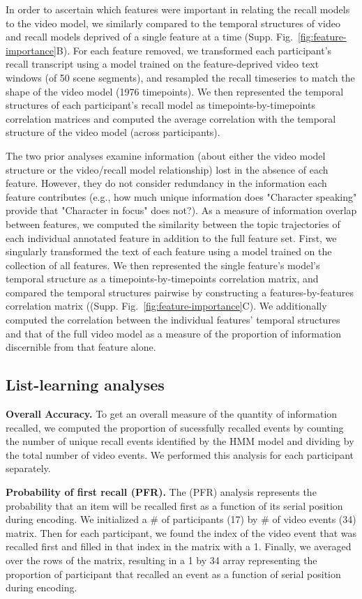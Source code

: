 \documentclass{article}
\begin{document}
In order to ascertain which features were important in relating the recall models to the video model, we similarly compared to the temporal structures of video and recall models deprived of a single feature at a time (Supp. Fig.~\ref{fig:feature-importance}B). For each feature removed, we transformed each participant’s recall transcript using a model trained on the feature-deprived video text windows (of 50 scene segments), and resampled the recall timeseries to match the shape of the video model (1976 timepoints). We then represented the temporal structures of each participant’s recall model as timepoints-by-timepoints correlation matrices and computed the average correlation with the temporal structure of the video model (across participants).

The two prior analyses examine information (about either the video model structure or the video/recall model relationship) lost in the absence of each feature. However, they do not consider redundancy in the information each feature contributes (e.g., how much unique information does "Character speaking" provide that "Character in focus" does not?). As a measure of information overlap between features, we computed the similarity between the topic trajectories of each individual annotated feature in addition to the full feature set. First, we singularly transformed the text of each feature using a model trained on the collection of all features. We then represented the single feature's model's temporal structure as a timepoints-by-timepoints correlation matrix, and compared the temporal structures pairwise by constructing a features-by-features correlation matrix ((Supp. Fig.~\ref{fig:feature-importance}C). We additionally computed the correlation between the individual features' temporal structures and that of the full video model as a measure of the proportion of information discernible from that feature alone.

\subsection*{List-learning analyses}
\textbf{Overall Accuracy.}  To get an overall measure of the quantity of information recalled, we computed the proportion of sucessfully recalled events by counting the number of unique recall events identified by the HMM model and dividing by the total number of video events.  We performed this analysis for each participant separately.

\textbf{Probability of first recall (PFR).}  The (PFR) analysis represents the probability that an item will be recalled first as a function of its serial position during encoding. We initialized a \# of participants (17) by \# of video events (34) matrix. Then for each participant, we found the index of the video event that was recalled first and filled in that index in the matrix with a 1.  Finally, we averaged over the rows of the matrix, resulting in a 1 by 34 array representing the proportion of participant that recalled an event as a function of serial position during encoding.
\end{document}
